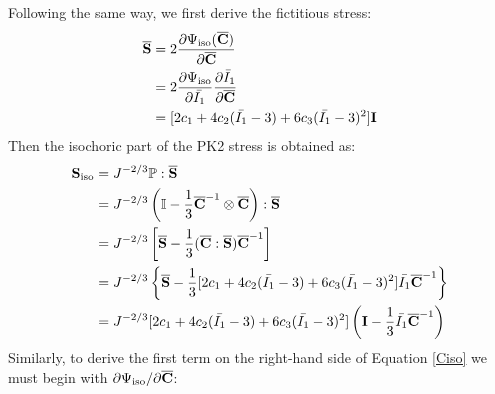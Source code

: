 Following the same way, we first derive the fictitious stress:
\begin{equation} \label{Sbar2}
\begin{split}
\overline{\bold{S}} &= 2\frac{\partial\Psi_\mathrm{iso}({\overline{\bold{C}})}}{\partial\overline{\bold{C}}} \\
&= 2\frac{\partial\Psi_\mathrm{iso}}{\partial\bar{I_1}} \frac{\partial \bar{I}_1}{\partial \overline{\bold{C}}} \\
&= [2c_1 + 4c_2(\bar{I_1} - 3) + 6c_3(\bar{I_1} - 3)^2] \bold{I} \\
\end{split}
\end{equation}
Then the isochoric part of the PK2 stress is obtained as:
\begin{equation} \label{Siso2}
\begin{split}
{\bold{S}}_\mathrm{iso} 
&= J^{-2/3} \mathbb{P} : \overline{\bold{S}} \\
&= J^{-2/3}\left(\mathbb{I} - \frac{1}{3}{\overline{\bold{C}}}^{-1} \otimes \overline{\bold{C}}\right) : \overline{\bold{S}}\\
&= J^{-2/3} \left[ \overline{\bold{S}} - \frac{1}{3} (\overline{\bold{C}} : \overline{\bold{S}}) \overline{\bold{C}}^{-1}  \right] \\
&= J^{-2/3} \left\{\overline{\bold{S}} - \frac{1}{3} [2c_1 + 4c_2(\bar{I_1} - 3) + 6c_3(\bar{I_1} - 3)^2] \bar{I_1}\overline{\bold{C}}^{-1} \right\} \\
&= J^{-2/3}[2c_1 + 4c_2(\bar{I_1} - 3) + 6c_3(\bar{I_1} - 3)^2] \left(\bold{I} - \frac{1}{3}\bar{I_1}{\overline{\bold{C}}}^{-1} \right)
\end{split}
\end{equation}
Similarly, to derive the first term on the right-hand side of Equation \ref{Ciso} we must begin with $\partial{\Psi_\mathrm{iso}}/\partial{\overline{\bold{C}}}$:


